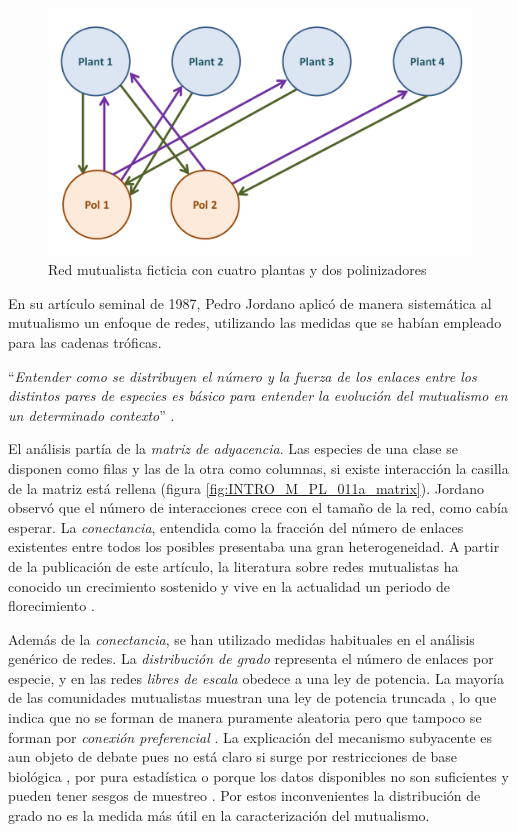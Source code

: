 \begin{figure}[h!]
\centering
\includegraphics[scale=0.30]{Figures/INTRO_bip_ficticia.png}
\caption{Red mutualista ficticia con cuatro plantas y dos polinizadores}
\label{fig:INTRO_bip_ficticia}
\end{figure}

En su artículo seminal de 1987, Pedro Jordano aplicó de manera sistemática al mutualismo un enfoque de redes, utilizando las medidas que se habían empleado para las cadenas tróficas.

\enquote{\itshape Entender como se distribuyen el número y la fuerza de los enlaces entre los distintos pares de especies es básico para entender la evolución del mutualismo en un determinado contexto} \cite{jordano1987patterns}.

El análisis partía de la \textit{matriz de adyacencia}. Las especies de una clase se disponen como filas y las de la otra como columnas, si existe interacción la casilla de la matriz está rellena (figura \ref{fig:INTRO_M_PL_011a_matrix}). Jordano observó que el número de interacciones crece con el tamaño de la red, como cabía esperar. La \textit{conectancia}, entendida como la fracción del número de enlaces existentes entre todos los posibles presentaba una gran heterogeneidad. A partir de la publicación de este artículo, la literatura sobre redes mutualistas ha conocido un crecimiento sostenido y vive en la actualidad un periodo de florecimiento \cite{gu2015emerging}.

Además de la \textit{conectancia}, se han utilizado medidas habituales en el análisis genérico de redes. La \textit{distribución de grado} representa el número de enlaces por especie, y en las redes \textit{libres de escala} obedece a una ley de potencia. La mayoría de las comunidades mutualistas muestran una ley de potencia truncada \cite{jordano2003invariant}, lo que indica que no se forman de manera puramente aleatoria pero que tampoco se forman por \textit{conexión preferencial} \cite{barabasi1999emergence}. La explicación del mecanismo subyacente es aun objeto de debate pues no está claro si surge por restricciones de base biológica \cite{bascompte2007plant}, por pura estadística \cite{vazquez2005degree} o porque los datos disponibles no son suficientes y pueden tener sesgos de muestreo \cite{okuyama2008mutualistic, williams2011biology}. Por estos inconvenientes la distribución de grado no es la medida más útil en la caracterización del mutualismo.

